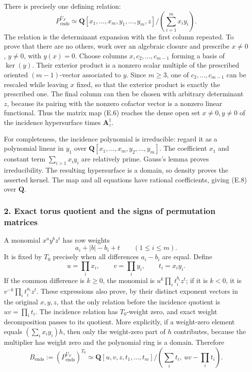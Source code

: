 \documentclass[
  10pt,
]{article}
\begin{document}
There is precisely one defining relation: \[
\boxed{
P^{U_F}_{\mathrm{ends}}
\simeq\mathbf Q[x_1,\ldots,x_m,y_1,\ldots,y_m,z]
\big/\left(\sum_{i=1}^m x_i y_i\right).}
\tag{E.8}
\] The relation is the determinant expansion with the first column
repeated. To prove that there are no others, work over an algebraic
closure and prescribe \(x\ne0\), \(y\ne0\), with \(y(x)=0\). Choose
columns \(x,c_2,\ldots,c_{m-1}\) forming a basis of \(\ker(y)\). Their
exterior product is a nonzero scalar multiple of the prescribed oriented
\((m-1)\)-vector associated to \(y\). Since \(m\ge3\), one of
\(c_2,\ldots,c_{m-1}\) can be rescaled while leaving \(x\) fixed, so
that the exterior product is exactly the prescribed one. The final
column can then be chosen with arbitrary determinant \(z\), because its
pairing with the nonzero cofactor vector is a nonzero linear functional.
Thus the matrix map (E.6) reaches the dense open set \(x\ne0,y\ne0\) of
the incidence hypersurface times \(\mathbf A^1_z\).

For completeness, the incidence polynomial is irreducible: regard it as
a polynomial linear in \(y_1\) over
\(\mathbf Q[x_1,\ldots,x_m,y_2,\ldots,y_m]\). The coefficient \(x_1\)
and constant term \(\sum_{i>1}x_i y_i\) are relatively prime. Gauss's
lemma proves irreducibility. The resulting hypersurface is a domain, so
density proves the asserted kernel. The map and all equations have
rational coefficients, giving (E.8) over \(\mathbf Q\).

\subsubsection{2. Exact torus quotient and the signs of permutation
matrices}\label{exact-torus-quotient-and-the-signs-of-permutation-matrices}

A monomial \(x^a y^b z^t\) has row weights \[
a_i+|b|-b_i+t\qquad (1\le i\le m).
\tag{E.9}
\] It is fixed by \(T_0\) precisely when all differences \(a_i-b_i\) are
equal. Define \[
u=\prod_i x_i,\qquad v=\prod_i y_i,\qquad t_i=x_i y_i.
\tag{E.10}
\] If the common difference is \(k\ge0\), the monomial is
\(u^k\prod_i t_i^{b_i}z^t\); if it is \(k<0\), it is
\(v^{-k}\prod_i t_i^{a_i}z^t\). These expressions also prove, by their
distinct exponent vectors in the original \(x,y,z\), that the only
relation before the incidence quotient is \(uv=\prod_i t_i\). The
incidence relation has \(T_0\)-weight zero, and exact weight
decomposition passes to its quotient. More explicitly, if a weight-zero
element equals \((\sum_i x_i y_i)h\), then only the weight-zero part of
\(h\) contributes, because the multiplier has weight zero and the
polynomial ring is a domain. Therefore \[
\boxed{
B_{\mathrm{ends}}:=(P^{U_F}_{\mathrm{ends}})^{T_0}
\simeq\mathbf Q[u,v,z,t_1,\ldots,t_m]
/(\sum_i t_i,\ uv-\prod_i t_i).}
\tag{E.11}
\]
\end{document}
